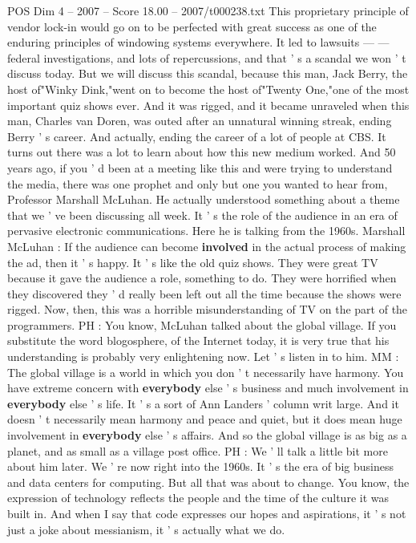 \begin{textsample}{POS Dim 4 – 2007 – Score 18.00 – 2007/t000238.txt}
This proprietary principle of vendor lock-in would go on to be perfected with great success as one of the enduring principles of windowing systems everywhere.
It led to lawsuits — — federal investigations, and lots of repercussions, and that ' s a scandal we won ' t discuss today.
But we will discuss this scandal, because this man, Jack Berry, the host of"Winky Dink,"went on to become the host of"Twenty One,"one of the most important quiz shows ever.
And it was rigged, and it became unraveled when this man, Charles van Doren, was outed after an unnatural winning streak, ending Berry ' s career.
And actually, ending the career of a lot of people at CBS.
It turns out there was a lot to learn about how this new medium worked.
And 50 years ago, if you ' d been at a meeting like this and were trying to understand the media, there was one prophet and only but one you wanted to hear from, Professor Marshall McLuhan.
He actually understood something about a theme that we ' ve been discussing all week.
It ' s the role of the audience in an era of pervasive electronic communications.
Here he is talking from the 1960s.
Marshall McLuhan : If the audience can become \textbf{involved} in the actual process of making the ad, then it ' s happy.
It ' s like the old quiz shows.
They were great TV because it gave the audience a role, something to do.
They were horrified when they discovered they ' d really been left out all the time because the shows were rigged.
Now, then, this was a horrible misunderstanding of TV on the part of the programmers.
PH : You know, McLuhan talked about the global village.
If you substitute the word blogosphere, of the Internet today, it is very true that his understanding is probably very enlightening now.
Let ' s listen in to him.
MM : The global village is a world in which you don ' t necessarily have harmony.
You have extreme concern with \textbf{everybody} else ' s business and much involvement in \textbf{everybody} else ' s life.
It ' s a sort of Ann Landers ' column writ large.
And it doesn ' t necessarily mean harmony and peace and quiet, but it does mean huge involvement in \textbf{everybody} else ' s affairs.
And so the global village is as big as a planet, and as small as a village post office.
PH : We ' ll talk a little bit more about him later.
We ' re now right into the 1960s.
It ' s the era of big business and data centers for computing.
But all that was about to change.
You know, the expression of technology reflects the people and the time of the culture it was built in.
And when I say that code expresses our hopes and aspirations, it ' s not just a joke about messianism, it ' s actually what we do.

\end{textsample}
